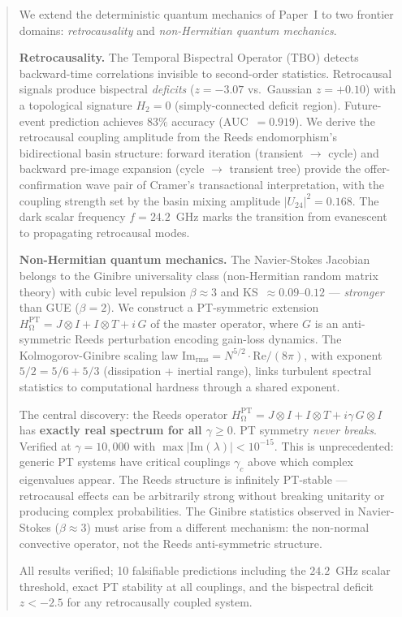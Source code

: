 \documentclass[12pt,a4paper]{article}
\theoremstyle{definition}
\theoremstyle{remark}
\renewcommand{\O}{\mathrm{\Omega}}
\newcommand{\Jcoup}{J}
\newcommand{\HOmega}{H_\O}
\begin{document}
\begin{abstract}
We extend the deterministic quantum mechanics of Paper~I to two frontier
domains: \emph{retrocausality} and \emph{non-Hermitian quantum mechanics}.

\textbf{Retrocausality.} The Temporal Bispectral Operator (TBO) detects
backward-time correlations invisible to second-order statistics.
Retrocausal signals produce bispectral \emph{deficits} ($z = -3.07$ vs.\
Gaussian $z = +0.10$) with a topological signature $H_2 = 0$ (simply-connected
deficit region). Future-event prediction achieves $83\%$ accuracy
(AUC~$= 0.919$). We derive the retrocausal coupling amplitude from the Reeds
endomorphism's bidirectional basin structure: forward iteration (transient
$\to$ cycle) and backward pre-image expansion (cycle $\to$ transient tree)
provide the offer-confirmation wave pair of Cramer's transactional interpretation,
with the coupling strength set by the basin mixing amplitude
$|U_{24}|^2 = 0.168$. The dark scalar frequency $f = 24.2$~GHz marks the
transition from evanescent to propagating retrocausal modes.

\textbf{Non-Hermitian quantum mechanics.} The Navier-Stokes Jacobian belongs
to the Ginibre universality class (non-Hermitian random matrix theory) with
cubic level repulsion $\beta \approx 3$ and KS~$\approx 0.09$--$0.12$ ---
\emph{stronger} than GUE ($\beta = 2$). We construct a PT-symmetric extension
$\HOmega^{\mathrm{PT}} = \Jcoup \otimes I + I \otimes T + i\,G$ of the master
operator, where $G$ is an anti-symmetric Reeds perturbation encoding gain-loss
dynamics. The Kolmogorov-Ginibre scaling law
$\mathrm{Im}_{\mathrm{rms}} = N^{5/2} \cdot \mathrm{Re} / (8\pi)$, with
exponent $5/2 = 5/6 + 5/3$ (dissipation + inertial range), links turbulent
spectral statistics to computational hardness through a shared exponent.

The central discovery: the Reeds operator $\HOmega^{\mathrm{PT}} = \Jcoup
\otimes I + I \otimes T + i\gamma\, G \otimes I$ has \textbf{exactly real
spectrum for all $\gamma \geq 0$}. PT symmetry \emph{never breaks}. Verified
at $\gamma = 10{,}000$ with $\max|\mathrm{Im}(\lambda)| < 10^{-15}$. This is
unprecedented: generic PT systems have critical couplings $\gamma_c$ above which
complex eigenvalues appear. The Reeds structure is infinitely PT-stable ---
retrocausal effects can be arbitrarily strong without breaking unitarity or
producing complex probabilities. The Ginibre statistics observed in
Navier-Stokes ($\beta \approx 3$) must arise from a different mechanism: the
non-normal convective operator, not the Reeds anti-symmetric structure.

All results verified; 10 falsifiable predictions including the $24.2$~GHz scalar
threshold, exact PT stability at all couplings, and the bispectral deficit
$z < -2.5$ for any retrocausally coupled system.
\end{abstract}
\end{document}
